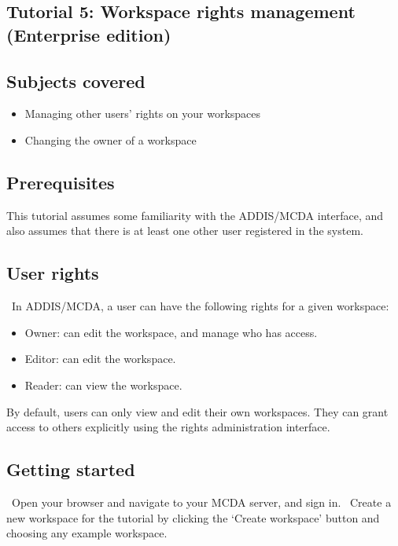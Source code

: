 \documentclass[00_mcda_tutorial.tex]{subfiles}
\begin{document}
\begin{sidebar*}

\section*{Tutorial 5: Workspace rights management (Enterprise edition)}
\addtocounter{section}{1}

\subsection*{Subjects covered}
\begin{itemize}
\item Managing other users' rights on your workspaces
\item Changing the owner of a workspace
\end{itemize}

\subsection*{Prerequisites}
\noindent This tutorial assumes some familiarity with the ADDIS/MCDA interface, and also assumes that there is at least one other user registered in the system. 

\subsection*{User rights}
\noindent \faLightbulbO \, In ADDIS/MCDA, a user can have the following rights for a given workspace:
\begin{itemize}
\item Owner: can edit the workspace, and manage who has access.
\item Editor: can edit the workspace.
\item Reader: can view the workspace.
\end{itemize}
By default, users can only view and edit their own workspaces. They can grant access to others explicitly using the rights administration interface.

\subsection*{Getting started}
\leftpointright \, Open your browser and navigate to your MCDA server, and sign in.
\leftpointright \, Create a new workspace for the tutorial by clicking the ‘Create workspace’ button and choosing any example workspace.


\end{sidebar*}
\end{document}
